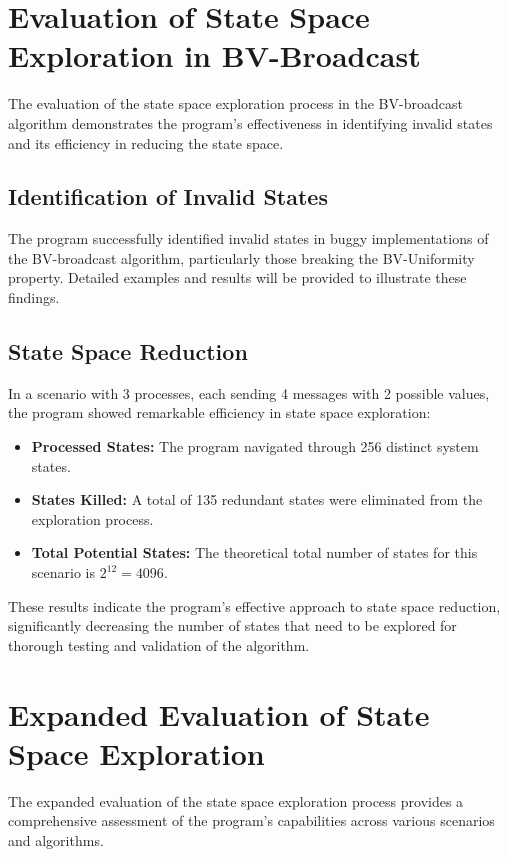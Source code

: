 \documentclass[a4paper,11pt,oneside]{report}
\begin{document}
\section{Evaluation of State Space Exploration in BV-Broadcast}
The evaluation of the state space exploration process in the BV-broadcast algorithm demonstrates the program's effectiveness in identifying invalid states and its efficiency in reducing the state space.

\subsection{Identification of Invalid States}
The program successfully identified invalid states in buggy implementations of the BV-broadcast algorithm, particularly those breaking the BV-Uniformity property. Detailed examples and results will be provided to illustrate these findings.

\subsection{State Space Reduction}
In a scenario with 3 processes, each sending 4 messages with 2 possible values, the program showed remarkable efficiency in state space exploration:

\begin{itemize}
    \item \textbf{Processed States:} The program navigated through 256 distinct system states.
    \item \textbf{States Killed:} A total of 135 redundant states were eliminated from the exploration process.
    \item \textbf{Total Potential States:} The theoretical total number of states for this scenario is \(2^{12} = 4096\).
\end{itemize}

These results indicate the program's effective approach to state space reduction, significantly decreasing the number of states that need to be explored for thorough testing and validation of the algorithm.

\section{Expanded Evaluation of State Space Exploration}
The expanded evaluation of the state space exploration process provides a comprehensive assessment of the program's capabilities across various scenarios and algorithms.
\end{document}
